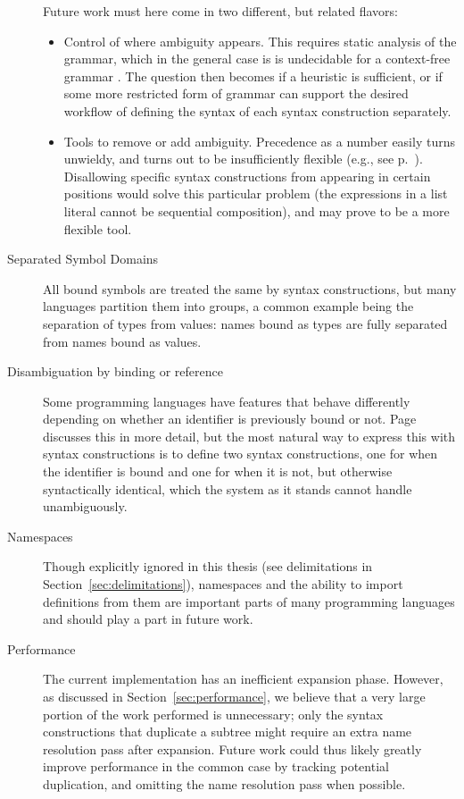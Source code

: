 \documentclass{kththesis}
\begin{document}
\begin{description}
  Future work must here come in two different, but related flavors:
  \begin{itemize}
    \item Control of where ambiguity appears. This requires static analysis of the grammar, which in the general case is is undecidable for a context-free grammar \cite{Cantor1962On-The-Ambiguit}. The question then becomes if a heuristic is sufficient, or if some more restricted form of grammar can support the desired workflow of defining the syntax of each syntax construction separately.

    \item Tools to remove or add ambiguity. Precedence as a number easily turns unwieldy, and turns out to be insufficiently flexible (e.g., see p.~\pageref{sec:ambiguous-lists}). Disallowing specific syntax constructions from appearing in certain positions would solve this particular problem (the expressions in a list literal cannot be sequential composition), and may prove to be a more flexible tool.
  \end{itemize}

  \item[Separated Symbol Domains] All bound symbols are treated the same by syntax constructions, but many languages partition them into groups, a common example being the separation of types from values: names bound as types are fully separated from names bound as values. %

  \item[Disambiguation by binding or reference] Some programming languages have features that behave differently depending on whether an identifier is previously bound or not. Page~\pageref{sec:prolog-pattern-matching} discusses this in more detail, but the most natural way to express this with syntax constructions is to define two syntax constructions, one for when the identifier is bound and one for when it is not, but otherwise syntactically identical, which the system as it stands cannot handle unambiguously.

  \item[Namespaces] Though explicitly ignored in this thesis (see delimitations in Section~\ref{sec:delimitations}), namespaces and the ability to import definitions from them are important parts of many programming languages and should play a part in future work.

  \item[Performance] The current implementation has an inefficient expansion phase. However, as discussed in Section~\ref{sec:performance}, we believe that a very large portion of the work performed is unnecessary; only the syntax constructions that duplicate a subtree might require an extra name resolution pass after expansion. Future work could thus likely greatly improve performance in the common case by tracking potential duplication, and omitting the name resolution pass when possible.
\end{description}
\end{document}
